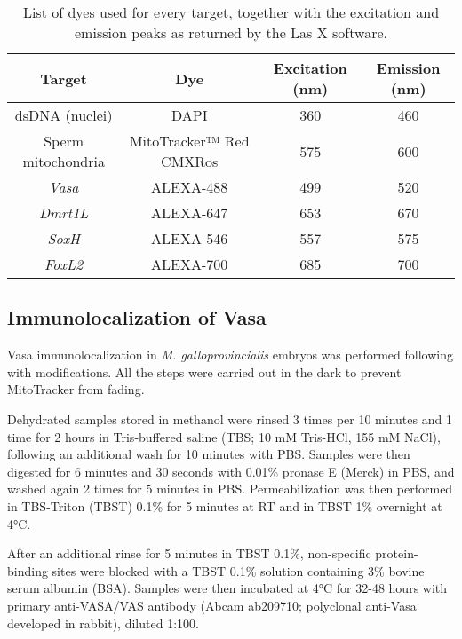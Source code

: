 \begin{table}
	\centering
	\begin{tabular}{@{}cccc@{}}
		\toprule
		\textbf{Target}    & \textbf{Dye}            & \textbf{Excitation (nm)} & \textbf{Emission (nm)} \\
		\midrule \midrule
		dsDNA (nuclei)     & DAPI                    & 360                      & 460                    \\
		Sperm mitochondria & MitoTracker™ Red CMXRos & 575                      & 600                    \\
		\textit{Vasa}      & ALEXA-488               & 499                      & 520                    \\
		\textit{Dmrt1L}    & ALEXA-647               & 653                      & 670                    \\
		\textit{SoxH}      & ALEXA-546               & 557                      & 575                    \\
		\textit{FoxL2}     & ALEXA-700               & 685                      & 700                    \\
		\bottomrule
	\end{tabular}
	\caption{List of dyes used for every target, together with the excitation and emission peaks as returned by the Las X software.}
	\label{tab:imaging}
\end{table}

\subsection{Immunolocalization of Vasa} \label{chapter4_MM_immuno}
Vasa immunolocalization in \textit{M. galloprovincialis} embryos was performed following \textbf{} with modifications. All the steps were carried out in the dark to prevent MitoTracker from fading.

Dehydrated samples stored in methanol were rinsed 3 times per 10 minutes and 1 time for 2 hours in Tris-buffered saline (TBS; 10 mM Tris-HCl, 155 mM NaCl), following an additional wash for 10 minutes with PBS. Samples were then digested for 6 minutes and 30 seconds with 0.01\% pronase E (Merck) in PBS, and washed again 2 times for 5 minutes in PBS. Permeabilization was then performed in TBS-Triton (TBST) 0.1\% for 5 minutes at RT and in TBST 1\% overnight at 4°C.

After an additional rinse for 5 minutes in TBST 0.1\%, non-specific protein-binding sites were blocked with a TBST 0.1\% solution containing 3\% bovine serum albumin (BSA). Samples were then incubated at 4°C for 32-48 hours with primary anti-VASA/VAS antibody (Abcam ab209710; polyclonal anti-Vasa developed in rabbit), diluted 1:100.

